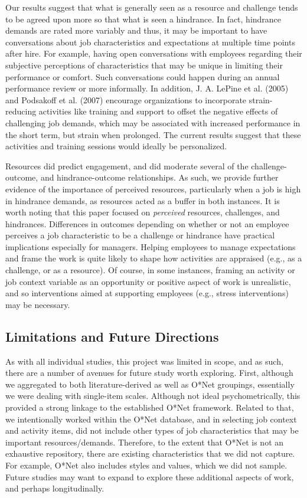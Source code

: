 \documentclass[
  man,mask]{apa7}
\begin{document}
Our results suggest that what is generally seen as a resource and challenge tends to be agreed upon more so that what is seen a hindrance. In fact, hindrance demands are rated more variably and thus, it may be important to have conversations about job characteristics and expectations at multiple time points after hire. For example, having open conversations with employees regarding their subjective perceptions of characteristics that may be unique in limiting their performance or comfort. Such conversations could happen during an annual performance review or more informally. In addition, J. A. LePine et al. (2005) and Podsakoff et al. (2007) encourage organizations to incorporate strain-reducing activities like training and support to offset the negative effects of challenging job demands, which may be associated with increased performance in the short term, but strain when prolonged. The current results suggest that these activities and training sessions would ideally be personalized.

Resources did predict engagement, and did moderate several of the challenge-outcome, and hindrance-outcome relationships. As such, we provide further evidence of the importance of perceived resources, particularly when a job is high in hindrance demands, as resources acted as a buffer in both instances. It is worth noting that this paper focused on \emph{perceived} resources, challenges, and hindrances. Differences in outcomes depending on whether or not an employee perceives a job characteristic to be a challenge or hindrance have practical implications especially for managers. Helping employees to manage expectations and frame the work is quite likely to shape how activities are appraised (e.g., as a challenge, or as a resource). Of course, in some instances, framing an activity or job context variable as an opportunity or positive aspect of work is unrealistic, and so interventions aimed at supporting employees (e.g., stress interventions) may be necessary.

\hypertarget{limitations-and-future-directions}{%
\subsection{Limitations and Future Directions}\label{limitations-and-future-directions}}

As with all individual studies, this project was limited in scope, and as such, there are a number of avenues for future study worth exploring. First, although we aggregated to both literature-derived as well as O*Net groupings, essentially we were dealing with single-item scales. Although not ideal psychometrically, this provided a strong linkage to the established O*Net framework. Related to that, we intentionally worked within the O*Net database, and in selecting job context and activity items, did not include other types of job characteristics that may be important resources/demands. Therefore, to the extent that O*Net is not an exhaustive repository, there are existing characteristics that we did not capture. For example, O*Net also includes styles and values, which we did not sample. Future studies may want to expand to explore these additional aspects of work, and perhaps longitudinally.
\end{document}
